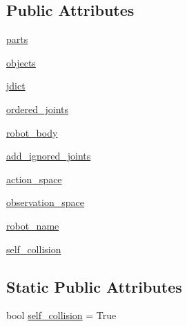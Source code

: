\subsection*{Public Attributes}
\begin{DoxyCompactItemize}
\item 
\hyperlink{classpybullet-gym_1_1pybulletgym_1_1envs_1_1mujoco_1_1robots_1_1robot__bases_1_1_xml_based_robot_a3ff6800d3bcf6181cacafe85ab65f459}{parts}
\item 
\hyperlink{classpybullet-gym_1_1pybulletgym_1_1envs_1_1mujoco_1_1robots_1_1robot__bases_1_1_xml_based_robot_a2fc52b66388adc463ddfb497cd57e1c5}{objects}
\item 
\hyperlink{classpybullet-gym_1_1pybulletgym_1_1envs_1_1mujoco_1_1robots_1_1robot__bases_1_1_xml_based_robot_aaaea868668ba6ba75381746647d74460}{jdict}
\item 
\hyperlink{classpybullet-gym_1_1pybulletgym_1_1envs_1_1mujoco_1_1robots_1_1robot__bases_1_1_xml_based_robot_a4cf059c2456c57f330e9dd05674563d6}{ordered\+\_\+joints}
\item 
\hyperlink{classpybullet-gym_1_1pybulletgym_1_1envs_1_1mujoco_1_1robots_1_1robot__bases_1_1_xml_based_robot_a38c20f5812dcbedff75c17aed152a67f}{robot\+\_\+body}
\item 
\hyperlink{classpybullet-gym_1_1pybulletgym_1_1envs_1_1mujoco_1_1robots_1_1robot__bases_1_1_xml_based_robot_a290307cdae32fb1a8e067fd2a5642861}{add\+\_\+ignored\+\_\+joints}
\item 
\hyperlink{classpybullet-gym_1_1pybulletgym_1_1envs_1_1mujoco_1_1robots_1_1robot__bases_1_1_xml_based_robot_a22a4fbfbfb2f2ab602f97be95e0b3137}{action\+\_\+space}
\item 
\hyperlink{classpybullet-gym_1_1pybulletgym_1_1envs_1_1mujoco_1_1robots_1_1robot__bases_1_1_xml_based_robot_a4c14ff0d5c934673053e380bf5ef50bf}{observation\+\_\+space}
\item 
\hyperlink{classpybullet-gym_1_1pybulletgym_1_1envs_1_1mujoco_1_1robots_1_1robot__bases_1_1_xml_based_robot_a5cbeb6a59e6f3507b1786ab2c99dad77}{robot\+\_\+name}
\item 
\hyperlink{classpybullet-gym_1_1pybulletgym_1_1envs_1_1mujoco_1_1robots_1_1robot__bases_1_1_xml_based_robot_a62ae0daf42e40246ddeade5892e5701c}{self\+\_\+collision}
\end{DoxyCompactItemize}
\subsection*{Static Public Attributes}
\begin{DoxyCompactItemize}
\item 
bool \hyperlink{classpybullet-gym_1_1pybulletgym_1_1envs_1_1mujoco_1_1robots_1_1robot__bases_1_1_xml_based_robot_aecec207b8ac56d1e4c6035ab29c49969}{self\+\_\+collision} = True
\end{DoxyCompactItemize}


